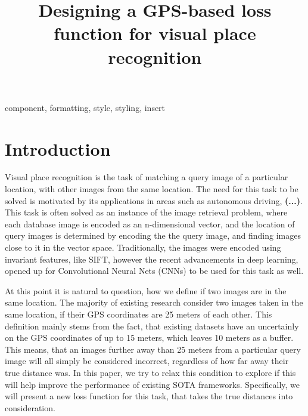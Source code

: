 \documentclass[conference]{IEEEtran}
\begin{document}
\title{Designing a GPS-based loss function for visual place recognition}

\author{
}

\maketitle

\begin{abstract}
\end{abstract}

\begin{IEEEkeywords}
component, formatting, style, styling, insert
\end{IEEEkeywords}

\section{Introduction}

Visual place recognition is the task of matching a query image of a particular location, with other images from the same location. The need for this task to be
solved is motivated by its applications in areas such as autonomous driving, \textbf{(...)}. This task is often solved as an instance of the image retrieval
problem, where each database image is encoded as an n-dimensional vector, and the location of query images is determined by encoding the the query image, and finding
images close to it in the vector space. Traditionally, the images were encoded using invariant features, like SIFT, however the recent advancements in deep learning, 
opened up for Convolutional Neural Nets (CNNs) to be used for this task as well.

At this point it is natural to question, how we define if two images are in the same location. The majority of existing research consider two images taken in the 
same location, if their GPS coordinates are 25 meters of each other. This definition mainly stems from the fact, that existing datasets have an uncertainly on 
the GPS coordinates of up to 15 meters, which leaves 10 meters as a buffer. This means, that an images further away than 25 meters from a particular query image 
will all simply be considered incorrect, regardless of how far away their true distance was. In this paper, we try to relax this condition to explore if this 
will help improve the performance of existing SOTA frameworks. Specifically, we will present a new loss function for this task, that takes the true distances into 
consideration.
\end{document}
